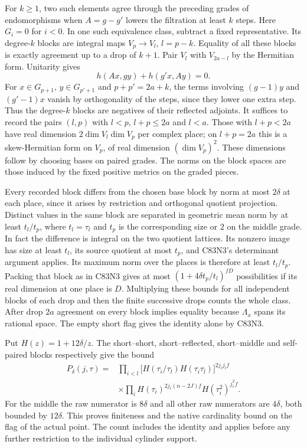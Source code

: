For $k\ge1$, two such elements agree through the preceding grades of
endomorphisms when $A=g-g'$ lowers the filtration at least $k$ steps.
Here $G_i=0$ for $i<0$. In one such equivalence class, subtract a
fixed representative. Its degree-$k$ blocks are integral maps
$V_p\to V_l$, $l=p-k$. Equality of all these blocks is exactly
agreement up to a drop of $k+1$. Pair $V_l$ with $V_{2a-l}$ by the
Hermitian form. Unitarity gives
\[
            h(Ax,gy)+h(g'x,Ay)=0 .
\]
For $x\in G_{p+1}$, $y\in G_{p'+1}$ and $p+p'=2a+k$, the terms
involving $(g-1)y$ and $(g'-1)x$ vanish by orthogonality of the
steps, since they lower one extra step. Thus the degree-$k$ blocks
are negatives of their reflected adjoints. It suffices to record
the pairs $(l,p)$ with $l<p$, $l+p\le2a$ and $l<a$. Those with
$l+p<2a$ have real dimension $2\dim V_l\dim V_p$ per complex place;
on $l+p=2a$ this is a skew-Hermitian form on $V_p$, of real
dimension $(\dim V_p)^2$. These dimensions follow by choosing
bases on paired grades. The norms on the block spaces are those
induced by the fixed positive metrics on the graded pieces.

Every recorded block differs from the chosen base block by norm at
most $2\delta$ at each place, since it arises by restriction and
orthogonal quotient projection. Distinct values in the same block
are separated in geometric mean norm by at least $t_l/t_p$, where
$t_l=\tau_l$ and $t_p$ is the corresponding size or $2$ on the
middle grade. In fact the difference is integral on the two
quotient lattices. Its nonzero image has size at least $t_l$, its
source quotient at most $t_p$, and C83N3's determinant argument
applies. Its maximum norm over the places is therefore at least
$t_l/t_p$. Packing that block as in C83N3 gives at most
$(1+4\delta t_p/t_l)^{fD}$ possibilities if its real dimension at
one place is $D$. Multiplying these bounds for all independent
blocks of each drop and then the finite successive drops counts
the whole class. After drop $2a$ agreement on every block implies
equality because $\Lambda_x$ spans its rational space.
The empty short flag gives the identity alone by C83N3.

Put $H(z)=1+12\delta/z$. The short--short, short--reflected,
short--middle and self-paired blocks respectively give the bound
\[
 \begin{aligned}
 P_\delta(j,\tau)={}&
 \prod_{i<l}
    \bigl[H(\tau_i/\tau_l)H(\tau_i\tau_l)\bigr]^{2j_i j_l f}\\
 &\times\prod_i H(\tau_i)^{2j_i(n-2J)f}
                             H(\tau_i^2)^{j_i^2f}.
 \end{aligned}
\]
For the middle the raw numerator is $8\delta$ and all other raw
numerators are $4\delta$, both bounded by $12\delta$. This proves
finiteness and the native cardinality bound on the flag of the actual
point. The count includes the identity and applies before any further
restriction to the individual cylinder support.

